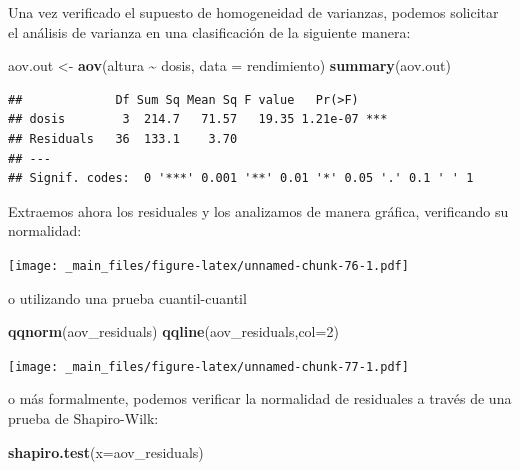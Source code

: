 \documentclass[
]{book}
\newenvironment{Shaded}{\begin{snugshade}}{\end{snugshade}}
\newcommand{\AttributeTok}[1]{\textcolor[rgb]{0.13,0.29,0.53}{#1}}
\newcommand{\DecValTok}[1]{\textcolor[rgb]{0.00,0.00,0.81}{#1}}
\newcommand{\FunctionTok}[1]{\textcolor[rgb]{0.13,0.29,0.53}{\textbf{#1}}}
\newcommand{\NormalTok}[1]{#1}
\newcommand{\OtherTok}[1]{\textcolor[rgb]{0.56,0.35,0.01}{#1}}
\newcommand{\SpecialCharTok}[1]{\textcolor[rgb]{0.81,0.36,0.00}{\textbf{#1}}}
\begin{document}
Una vez verificado el supuesto de homogeneidad de varianzas, podemos solicitar el análisis de varianza en una clasificación de la siguiente manera:

\begin{Shaded}
\begin{Highlighting}[]
\NormalTok{aov.out }\OtherTok{\textless{}{-}} \FunctionTok{aov}\NormalTok{(altura }\SpecialCharTok{\textasciitilde{}}\NormalTok{ dosis, }\AttributeTok{data =}\NormalTok{ rendimiento)}
\FunctionTok{summary}\NormalTok{(aov.out)}
\end{Highlighting}
\end{Shaded}

\begin{verbatim}
##             Df Sum Sq Mean Sq F value   Pr(>F)    
## dosis        3  214.7   71.57   19.35 1.21e-07 ***
## Residuals   36  133.1    3.70                     
## ---
## Signif. codes:  0 '***' 0.001 '**' 0.01 '*' 0.05 '.' 0.1 ' ' 1
\end{verbatim}

Extraemos ahora los residuales y los analizamos de manera gráfica, verificando su normalidad:

\begin{Shaded}
\end{Shaded}

\texttt{[image: \_main\_files/figure-latex/unnamed-chunk-76-1.pdf]}

o utilizando una prueba cuantil-cuantil

\begin{Shaded}
\begin{Highlighting}[]
\FunctionTok{qqnorm}\NormalTok{(aov\_residuals)}
\FunctionTok{qqline}\NormalTok{(aov\_residuals,}\AttributeTok{col=}\DecValTok{2}\NormalTok{)}
\end{Highlighting}
\end{Shaded}

\texttt{[image: \_main\_files/figure-latex/unnamed-chunk-77-1.pdf]}

o más formalmente, podemos verificar la normalidad de residuales a través de una prueba de Shapiro-Wilk:

\begin{Shaded}
\begin{Highlighting}[]
\FunctionTok{shapiro.test}\NormalTok{(}\AttributeTok{x=}\NormalTok{aov\_residuals)}
\end{Highlighting}
\end{Shaded}
\end{document}

